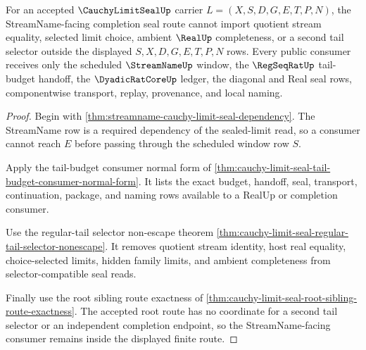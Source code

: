 \begin{theorem}
\label{thm:cauchy-limit-seal-streamname-nonescape}
For an accepted $\CauchyLimitSealUp$ carrier $L=(X,S,D,G,E,T,P,N)$, the StreamName-facing completion seal route cannot import quotient stream equality, selected limit choice, ambient $\RealUp$ completeness, or a second tail selector outside the displayed $S,X,D,G,E,T,P,N$ rows. Every public consumer receives only the scheduled $\StreamNameUp$ window, the $\RegSeqRatUp$ tail-budget handoff, the $\DyadicRatCoreUp$ ledger, the diagonal and Real seal rows, componentwise transport, replay, provenance, and local naming.
\end{theorem}
\begin{proof}
Begin with \autoref{thm:streamname-cauchy-limit-seal-dependency}. The StreamName row is a required dependency of the sealed-limit read, so a consumer cannot reach $E$ before passing through the scheduled window row $S$.

Apply the tail-budget consumer normal form of \autoref{thm:cauchy-limit-seal-tail-budget-consumer-normal-form}. It lists the exact budget, handoff, seal, transport, continuation, package, and naming rows available to a RealUp or completion consumer.

Use the regular-tail selector non-escape theorem \autoref{thm:cauchy-limit-seal-regular-tail-selector-nonescape}. It removes quotient stream identity, host real equality, choice-selected limits, hidden family limits, and ambient completeness from selector-compatible seal reads.

Finally use the root sibling route exactness of \autoref{thm:cauchy-limit-seal-root-sibling-route-exactness}. The accepted root route has no coordinate for a second tail selector or an independent completion endpoint, so the StreamName-facing consumer remains inside the displayed finite route.
\end{proof}

